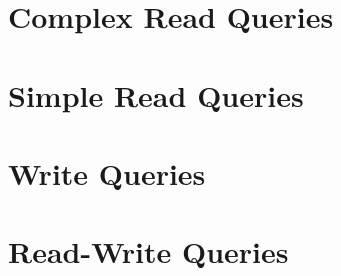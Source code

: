\section{Complex Read Queries}
\label{sec:complex-read-queries}




\section{Simple Read Queries}
\label{sec:simple-read-queries}




\section{Write Queries}
\label{sec:write-queries}




\section{Read-Write Queries}
\label{sec:rw-queries}



